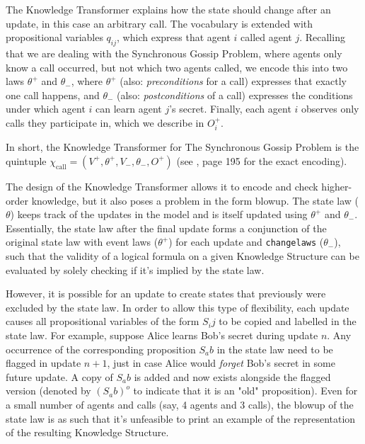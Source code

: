 The Knowledge Transformer explains how the state should change after an update, in this case an arbitrary call. 
The vocabulary is extended with propositional variables $q_{ij}$, which express that agent $i$ called agent $j$. 
Recalling that we are dealing with the Synchronous Gossip Problem, where agents only know a call occurred, 
but not which two agents called, we encode this into two laws $\theta^+$ and $\theta_-$, where $\theta^+$ 
(also: \textit{preconditions} for a call) expresses that exactly one 
call happens, and $\theta_-$ (also: \textit{postconditions} of a call) expresses the conditions under which agent $i$ can 
learn agent $j$'s secret. 
Finally, each agent $i$ observes only calls they participate in, which we describe in $O^+_i$. 

In short, the Knowledge Transformer for The Synchronous Gossip Problem is the quintuple 
$\chi_\text{call}=(V^+,\theta ^+,V_-,\theta _-,O^+)$ (see \cite{GattingerThesis2018}, page 195 for the exact encoding).

The design of the Knowledge Transformer allows it to encode and check higher-order knowledge, but it 
also poses a problem in the form blowup. The state law ($\theta$) keeps track 
of the updates in the model and is itself updated using $\theta^+$ and $\theta_-$. Essentially, the state law 
after the final update forms a conjunction of the original state law with event laws ($\theta^+$) for each update and 
\texttt{changelaws} ($\theta_-$), 
such that the validity of a logical formula on a given Knowledge Structure can be evaluated by solely checking if it's implied by 
the state law. 

However, it is possible for an update to create states that previously were excluded by the state law. 
In order to allow this type of flexibility, each update causes all propositional variables of the form $S_ij$  
to be copied and labelled in the state law. For example, suppose Alice learns Bob's secret during update $n$. 
Any occurrence of the corresponding proposition $S_ab$ in the state law need to be flagged in update $n+1$, just in case 
Alice would \textit{forget} Bob's secret in some future update. A copy of $S_ab$ is added and now exists alongside the 
flagged version (denoted by $(S_ab)^o$ to indicate that it is an "old" proposition). Even for a small number of agents and 
calls (say, 4 agents and 3 calls), the blowup of the state law is as such that it's unfeasible to print an example of the representation
of the resulting Knowledge Structure.

